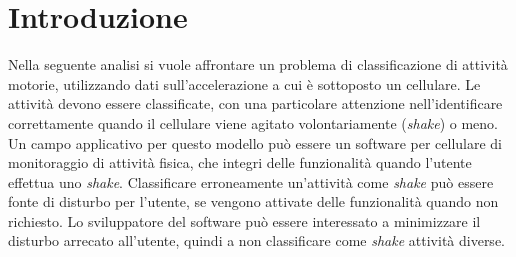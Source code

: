 \documentclass[./main.tex]{subfiles}
\begin{document}
\section{Introduzione}
Nella seguente analisi si vuole affrontare un problema di classificazione di attività motorie, utilizzando dati sull'accelerazione a cui è sottoposto un cellulare. Le attività devono essere classificate, con una particolare attenzione nell'identificare correttamente quando il cellulare viene agitato volontariamente ({\em shake}) o meno. Un campo applicativo per questo modello può essere un software per cellulare di monitoraggio di attività fisica, che integri delle funzionalità quando l'utente effettua uno {\em shake}. Classificare erroneamente un'attività come {\em shake} può essere fonte di disturbo per l'utente, se vengono attivate delle funzionalità quando non richiesto. Lo sviluppatore del software può essere interessato a minimizzare il disturbo arrecato all'utente, quindi a non classificare come {\em shake} attività diverse.\\
\end{document}
